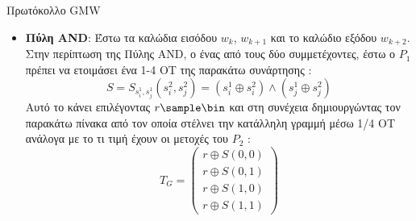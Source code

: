 \documentclass[10pt]{beamer}
\begin{document}
    \begin{frame}{Πρωτόκολλο GMW}
        \begin{block}{}
            \begin{itemize}
                \item \textbf{Πύλη AND}: Έστω τα καλώδια εισόδου $w_k$, $w_{k+1}$ και το καλώδιο εξόδου $w_{k+2}$. Στην περίπτωση της Πύλης AND, ο ένας από τους δύο συμμετέχοντες, έστω ο $P_1$ πρέπει να ετοιμάσει ένα 1-4 ΟΤ της παρακάτω συνάρτησης :
                \[
                S=S_{s_i^1, s_j^1}\left(s_i^2, s_j^2\right)=\left(s_i^1 \oplus s_i^2\right) \wedge\left(s_j^1 \oplus s_j^2\right)
                \]
                Αυτό το κάνει επιλέγοντας $r \sample \bin$ και στη συνέχεια δημιουργώντας τον παρακάτω πίνακα από τον οποία στέλνει την κατάλληλη γραμμή μέσω 1/4 OT ανάλογα με το τι τιμή έχουν οι μετοχές του $P_2$ :
                \[
                T_G=\left(\begin{array}{l}
                              r \oplus S(0,0) \\
                              r \oplus S(0,1) \\
                              r \oplus S(1,0) \\
                              r \oplus S(1,1)
                \end{array}\right)
                \]
            \end{itemize}
        \end{block}
    \end{frame}
\end{document}
